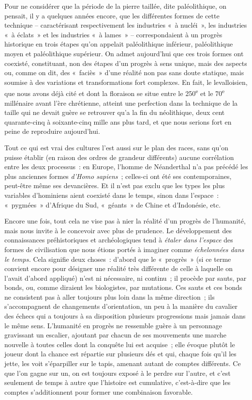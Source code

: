 \documentclass[french,twoside]{book} %
\begin{document}
Pour ne considérer que la période de la pierre taillée, dite paléolithique, on pensait, il y a quelques années encore, que les différentes formes de cette technique – caractérisant respectivement les industries « à nucléi », les industries « à éclats » et les industries « à lames » – correspondaient à un progrès historique en trois étapes qu’on appelait paléolithique inférieur, paléolithique moyen et paléolithique supérieur. On admet aujourd’hui que ces trois formes ont coexisté, constituant, non des étapes d’un progrès à sens unique, mais des aspects ou, comme on dit, des « faciès » d’une réalité non pas sans doute statique, mais soumise à des variations et transformations fort complexes. En fait, le levalloisien, que nous avons déjà cité et dont la floraison se situe entre le 250\textsuperscript{e} et le 70\textsuperscript{e} millénaire avant l’ère chrétienne, atteint une perfection dans la technique de la taille qui ne devait guère se retrouver qu’a la fin du néolithique, deux cent quarante-cinq à soixante-cinq mille ans plus tard, et que nous serions fort en peine de reproduire aujourd’hui.\par
Tout ce qui est vrai des cultures l’est aussi sur le plan des races, sans qu’on puisse établir (en raison des ordres de grandeur différents) aucune corrélation entre les deux processus : en Europe, l’homme de Néanderthal n’a pas précédé les plus anciennes formes \emph{d’Homo sapiens} ; celles-ci ont été ses contemporaines, peut-être même ses devancières. Et il n’est pas exclu que les types les plus variables d’hominiens aient coexisté dans le temps, sinon dans l’espace : « pygmées » d’Afrique du Sud, « géants » de Chine et d’Indonésie, etc.\par
Encore une fois, tout cela ne vise pas à nier la réalité d’un progrès de l’humanité, mais nous invite à le concevoir avec plus de prudence. Le développement des connaissances préhistoriques et archéologiques tend à \emph{étaler dans l’espace} des formes de civilisation que nous étions portés à imaginer comme \emph{échelonnées dans le temps.} Cela signifie deux choses : d’abord que le « progrès » (si ce terme convient encore pour désigner une réalité très différente de celle à laquelle on l’avait d’abord appliqué) n’est ni nécessaire, ni continu ; il procède par sauts, par bonds, ou, comme diraient les biologistes, par mutations. Ces sauts et ces bonds ne consistent pas à aller toujours plus loin dans la même direction ; ils s’accompagnent de changements d’orientation, un peu à la manière du cavalier des échecs qui a toujours à sa disposition plusieurs progressions mais jamais dans le même sens. L’humanité en progrès ne ressemble guère à un personnage gravissant un escalier, ajoutant par chacun de ses mouvements une marche nouvelle à toutes celles dont la conquête lui est acquise ; elle évoque plutôt le joueur dont la chance est répartie sur plusieurs dés et qui, chaque fois qu’il les jette, les voit s’éparpiller sur le tapis, amenant autant de comptes différents. Ce que l’on gagne sur un, on est toujours exposé à le perdre sur l’autre, et c’est seulement de temps à autre que l’histoire est cumulative, c’est-à-dire que les comptes s’additionnent pour former une combinaison favorable.\par
\end{document}
